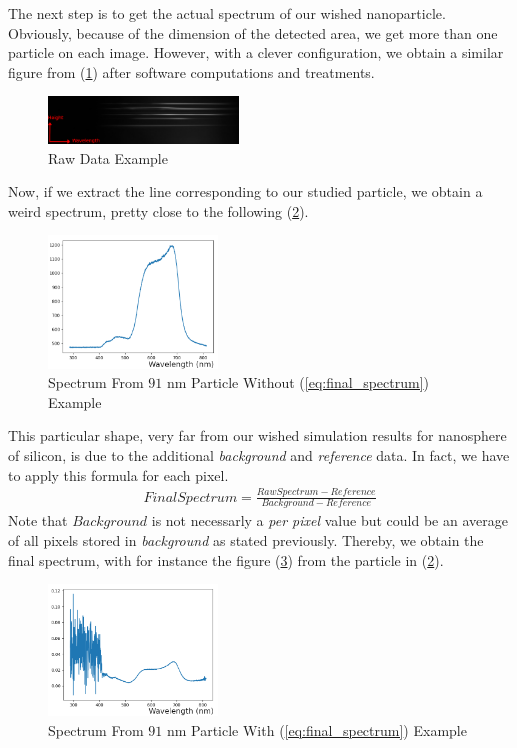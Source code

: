 \documentclass{article}
\numberwithin{equation}{section}
\begin{document}
The next step is to get the actual spectrum of our wished nanoparticle. Obviously, because of the dimension of the detected area, we get more than one particle on each image. However, with a clever configuration, we obtain a similar figure from (\ref{fig:raw_data_ex}) after software computations and treatments.
\begin{figure}[h!]
    \centering
    \includegraphics[width=0.45\textwidth, height=0.15\textwidth]{raw_data_ex.png}
    \caption{Raw Data Example}
    \label{fig:raw_data_ex}
\end{figure}
Now, if we extract the line corresponding to our studied particle, we obtain a weird spectrum, pretty close to the following (\ref{fig:spectrum_wout_calc_ex}).
\begin{figure}[h!]
    \centering
    \includegraphics[width=0.4\textwidth, height=0.35\textwidth]{spectrum_wout_calc_ex.png}
    \caption{Spectrum From $91$ nm Particle Without (\ref{eq:final_spectrum}) Example}
    \label{fig:spectrum_wout_calc_ex}
\end{figure}
This particular shape, very far from our wished simulation results for nanosphere of silicon, is due to the additional \textit{background} and \textit{reference} data. In fact, we have to apply this formula for each pixel.
\begin{align}\label{eq:final_spectrum}
FinalSpectrum = \frac{RawSpectrum - Reference}{Background - Reference}
\end{align}
Note that $Background$ is not necessarly a \textit{per pixel} value but could be an average of all pixels stored in \textit{background} as stated previously. Thereby, we obtain the final spectrum, with for instance the figure (\ref{fig:spectrum_w_calc_ex}) from the particle in (\ref{fig:spectrum_wout_calc_ex}).
\begin{figure}[h!]
    \centering
    \includegraphics[width=0.4\textwidth, height=0.35\textwidth]{spectrum_w_calc_ex.png}
    \caption{Spectrum From $91$ nm Particle With (\ref{eq:final_spectrum}) Example}
    \label{fig:spectrum_w_calc_ex}
\end{figure}
\end{document}
